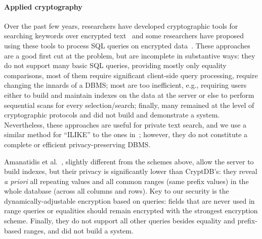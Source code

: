 \paragraph{Applied cryptography}
Over the past few years, researchers have developed cryptographic tools for
searching keywords over encrypted text~\cite{Dawn-Song-Search-2000,
queriesEncryptionBoneh} and some researchers have proposed using these tools to
process SQL queries on encrypted
data~\cite{private-query-multi-user-for-searchable,
 Chang04privacypreserving, encrypt-for-secure-outsource,
 Yang-privacy-preserving-queries}. These approaches are a good first cut at the
 problem, but are incomplete in substantive ways: they do not support many basic
 SQL queries, providing mostly only equality comparisons, most of
 them require significant client-side query processing, require changing the
 innards of a DBMS;  most are too inefficient, e.g., requiring
users either to build and maintain indexes on the data at the server or else to
perform sequential scans for every selection/search; finally, many remained at
the level of cryptographic protocols and did not build and demonstrate
a system. Nevertheless, these approaches are useful for private text search, and we use a
similar method for ``ILIKE'' to the ones in~\cite{amanatidis-boldyreva-o'neill,
Dawn-Song-Search-2000}; however, they do not constitute a complete or efficient
privacy-preserving DBMS\@.


Amanatidis et al.~\cite{amanatidis-boldyreva-o'neill}, slightly different from
the schemes above, allow the server to build indexes, but their privacy
is significantly lower than CryptDB's: they reveal {\em a priori} all repeating values and all common ranges
(same prefix values) in the whole database (across all columns and rows). Key to our security is the
dynamically-adjustable encryption based on queries: fields that are never used
in range queries or equalities should remain encrypted with the strongest
encryption scheme. Finally, they do not support all other queries besides
equality and prefix-based ranges, and did not build a system.

